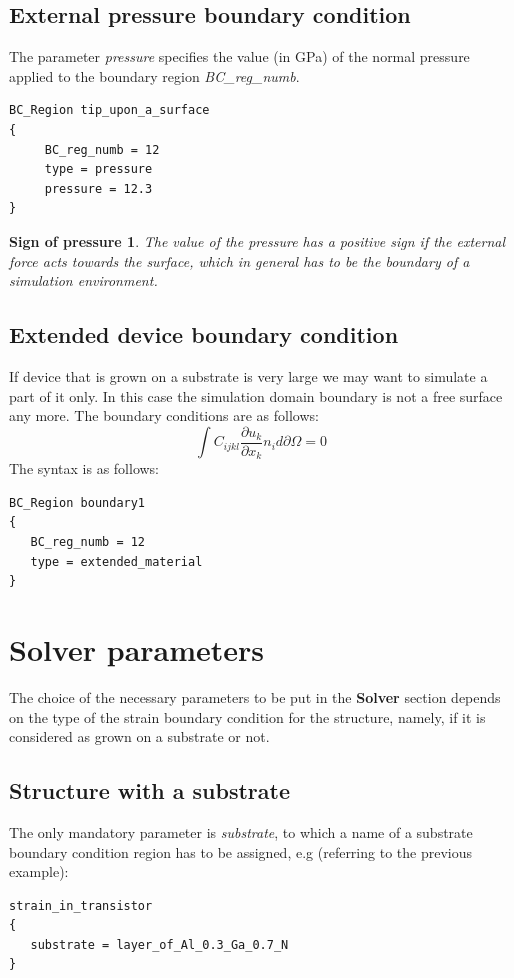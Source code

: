 \subsection{External pressure boundary condition}
The parameter \textit{pressure} specifies the value (in GPa)  of the normal pressure applied to the boundary region \textit{BC\_reg\_numb}. 
\begin{verbatim}
BC_Region tip_upon_a_surface
{
     BC_reg_numb = 12
     type = pressure
     pressure = 12.3
}
\end{verbatim}
\newtheorem*{pressure}{Sign of pressure}
\begin{pressure}
 The value of the pressure has a positive sign if the external force acts towards the
 surface, which in general has to be  the  boundary of a simulation environment.
\end{pressure}

\subsection{Extended device boundary condition}
If device that is grown on a substrate is very large we may want to simulate a part of it only. In this case the simulation domain boundary is not a free surface any more.
The boundary conditions are as follows:
\begin{equation}
   \int C_{ijkl} \frac{\partial u_k}{\partial x_k} n_i d\partial\Omega = 0
\end{equation}
The syntax is as follows:
\begin{verbatim}
BC_Region boundary1
{
   BC_reg_numb = 12
   type = extended_material
}
\end{verbatim}




\section{Solver parameters}
The choice of the necessary parameters to be put in the \textbf{Solver} section depends on the type of the strain boundary condition for the structure, namely, if it is considered as grown on  a substrate or not. 
\subsection{Structure with a substrate}
The only mandatory parameter is  \textit{substrate}, to  which   a name of a substrate boundary condition region has to be  assigned, e.g (referring to the previous example):
\begin{verbatim}
strain_in_transistor
{
   substrate = layer_of_Al_0.3_Ga_0.7_N
}
\end{verbatim}

